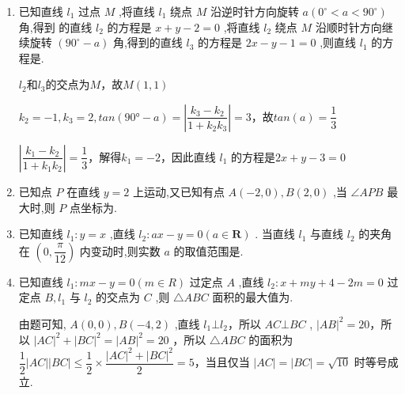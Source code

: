 \begin{enumerate}
\begin{jieda}
        当 ${AP} \bot  l$ 时,点 $P\left( {1, - 2}\right)$ 到直线 $l : \left( {3 + {2\lambda }}\right) x + \left( {4 + \lambda }\right) y - 2 + {2\lambda } = 0\left( {\lambda  \in  \mathbf{R}}\right)$ 的距离最大，最大值为 $\left| {AP}\right|  = \sqrt{{\left( -2 - 1\right) }^{2} + {\left( 2 + 2\right) }^{2}} = 5$ ,又直线 ${AP}$ 的斜率 ${k}_{AP} = \dfrac{2 + 2}{-2 - 1} =  - \dfrac{4}{3}$，所以直线 $l$ 的方程为 $y - 2 = \dfrac{3}{4}\left( {x + 2}\right)$ ,即 ${3x} - {4y} + {14} = 0$ .
    \end{jieda}

    \item 已知直线 ${l}_{1}$ 过点 $M$ ,将直线 ${l}_{1}$ 绕点 $M$ 沿逆时针方向旋转 $a\left( {{0}^{ \circ  } < a < {90}^{ \circ  }}\right)$ 角,得到 的直线 ${l}_{2}$ 的方程是 $x + y - 2 = 0$ ,将直线 ${l}_{2}$ 绕点 $M$ 沿顺时针方向继续旋转 $\left( {{90}^{ \circ  } - a}\right)$ 角,得到的直线 ${l}_{3}$ 的方程是 ${2x} - y - 1 = 0$ ,则直线 ${l}_{1}$ 的方程是.
    \begin{jieda}
        $l_2$和$l_3$的交点为$M$，故$M(1, 1)$

        $k_2 = -1, k_3 = 2, tan(\ang{90} - a) = \left|\dfrac{k_3-k_2}{1+k_2k_3}\right| = 3$，故$tan(a) = \dfrac{1}{3}$
        
        $\left|\dfrac{k_1-k_2}{1+k_1k_2}\right| = \dfrac{1}{3}$，解得$k_1 = -2$，因此直线 ${l}_{1}$ 的方程是$2x+y-3 = 0$
    \end{jieda}

    \item 已知点 $P$ 在直线 $y = 2$ 上运动,又已知有点 $A\left( {-2,0}\right) ,B\left( {2,0}\right)$ ,当 $\angle {APB}$ 最大时,则 $P$ 点坐标为.

    \item 已知直线 ${l}_{1} : y = x$ ,直线 ${l}_{2} : {ax} - y = 0\left( {a \in  \mathbf{R}}\right)$ . 当直线 ${l}_{1}$ 与直线 ${l}_{2}$ 的夹角在 $\left( {0,\dfrac{\pi }{12}}\right)$ 内变动时,则实数 $a$ 的取值范围是.

    \item 已知直线 ${l}_{1} : {mx} - y = 0\left( {m \in  {R}}\right)$ 过定点 ${A}$ ,直线 ${l}_{2} : x + {my} + 4 - {2m} = 0$ 过定点 $B,{l}_{1}$ 与 ${l}_{2}$ 的交点为 $C$ ,则 $\bigtriangleup  {{ABC}}$ 面积的最大值为.
    \begin{jieda}
        由题可知, $A\left( {0,0}\right) ,B\left( {-4,2}\right)$ ,直线 ${l}_{1} \bot  {l}_{2}$，所以 ${AC}\bot {BC}$ , ${\left| AB\right| }^{2} = {20}$，所以 ${\left| AC\right| }^{2} + {\left| BC\right| }^{2} = {\left| AB\right| }^{2} = {20}$ ，所以 $\triangle {ABC}$ 的面积为 $\dfrac{1}{2}\left| {AC}\right| \left| {BC}\right|  \leq  \dfrac{1}{2} \times  \dfrac{{\left| AC\right| }^{2} + {\left| BC\right| }^{2}}{2} = 5$，当且仅当 $\left| {AC}\right|  = \left| {BC}\right|  = \sqrt{10}$ 时等号成立.
    \end{jieda}


\end{enumerate}
